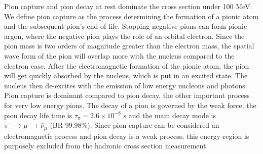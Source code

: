 Pion capture and pion decay at rest dominate the cross section under 100 MeV. We define pion capture as the process determining the formation of a pionic atom and the subsequent pion's end of life. Stopping negative pions can form pionic argon, where the negative pion plays the role of an orbital electron. Since the pion mass is two orders of magnitude greater than the electron mass, the spatial wave form of the pion will overlap more with the nucleus compared to the electron case. After the electromagnetic formation of the pionic atom, the pion will get quickly absorbed by the nucleus, which is put in an excited state. The nucleus then de-excites with the emission of low energy nucleons and photons.  Pion capture is dominant compared to pion decay, the other important process for very low energy pions. The decay of a pion is governed by the weak force; the pion decay life time is $\tau_\pi = 2.6 \times 10^{-8}$ s and the main decay mode is  $\pi^-\rightarrow \mu^- + \bar\nu_\mu$ (BR 99.98\%). %
 Since pion capture can be considered an electromagnetic process and pion decay is a weak process, this energy region is purposely excluded from the hadronic cross section measurement.


